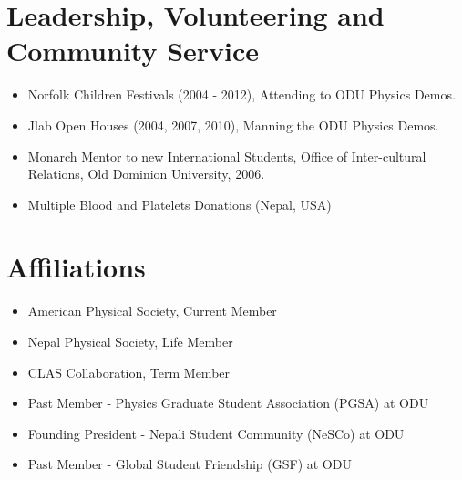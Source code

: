 \documentclass[10pt, letterpaper]{article}
\begin{document}
\section*{Leadership, Volunteering and Community Service}
\noindent
\begin{itemize}
\item Norfolk Children Festivals (2004 - 2012), Attending to ODU Physics Demos.
\item Jlab Open Houses (2004, 2007, 2010), Manning the ODU Physics Demos.
\item Monarch Mentor to new International Students, Office of Inter-cultural Relations, Old Dominion University, 2006.
\item Multiple Blood and Platelets Donations (Nepal, USA)
\end{itemize}


\section*{Affiliations}
\noindent
\begin{itemize}
  \item American Physical Society, Current Member 
  \item Nepal Physical Society, Life Member %
  \item CLAS Collaboration, Term Member %
  \item Past Member - Physics Graduate Student Association (PGSA) at ODU
  \item Founding President - Nepali Student Community (NeSCo) at ODU
  \item Past Member - Global Student Friendship (GSF) at ODU
\end{itemize}
\end{document}

